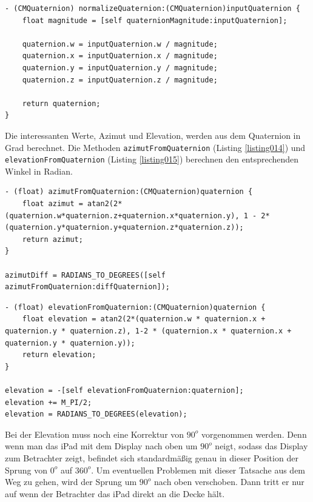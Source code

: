 \begin{lstlisting}[float=htb, caption=Methode \texttt{normalizeQuaternion}, label=listing013]
- (CMQuaternion) normalizeQuaternion:(CMQuaternion)inputQuaternion {
	float magnitude = [self quaternionMagnitude:inputQuaternion];
	
	quaternion.w = inputQuaternion.w / magnitude;
	quaternion.x = inputQuaternion.x / magnitude;
	quaternion.y = inputQuaternion.y / magnitude;
	quaternion.z = inputQuaternion.z / magnitude;
	
	return quaternion;
}
\end{lstlisting}

Die interessanten Werte, Azimut und Elevation, werden aus dem Quaternion in Grad berechnet. Die Methoden \texttt{azimutFromQuaternion} (Listing \ref{listing014}) und \texttt{elevationFromQuaternion}  (Listing \ref{listing015}) berechnen den entsprechenden Winkel in Radian.
~\\
\begin{lstlisting}[float=htb, caption=Azimut-Wert aus Quaternion berechnen, label=listing014]
- (float) azimutFromQuaternion:(CMQuaternion)quaternion {
	float azimut = atan2(2*(quaternion.w*quaternion.z+quaternion.x*quaternion.y), 1 - 2*(quaternion.y*quaternion.y+quaternion.z*quaternion.z));
	return azimut;
}

azimutDiff = RADIANS_TO_DEGREES([self azimutFromQuaternion:diffQuaternion]);
\end{lstlisting}

\begin{lstlisting}[float=htb, float=htb, caption=Elevation-Wert aus Quaternion berechnen, label=listing015]
- (float) elevationFromQuaternion:(CMQuaternion)quaternion {
	float elevation = atan2(2*(quaternion.w * quaternion.x + quaternion.y * quaternion.z), 1-2 * (quaternion.x * quaternion.x + quaternion.y * quaternion.y));
	return elevation;
} 

elevation = -[self elevationFromQuaternion:quaternion];
elevation += M_PI/2;
elevation = RADIANS_TO_DEGREES(elevation);
\end{lstlisting}

Bei der Elevation muss noch eine Korrektur von $90^o$ vorgenommen werden. Denn wenn man das iPad mit dem Display nach oben um $90^o$ neigt, sodass das Display zum Betrachter zeigt, befindet sich standardmäßig genau in dieser Position der Sprung von $0^o$ auf $360^o$. Um eventuellen Problemen mit dieser Tatsache aus dem Weg zu gehen, wird der Sprung um $90^o$ nach oben verschoben. Dann tritt er nur auf wenn der Betrachter das iPad direkt an die Decke hält. \cite{paper:001} \cite{mathworks}

